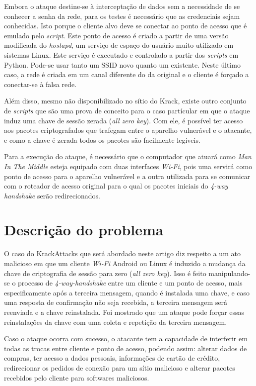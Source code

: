 \documentclass[12pt]{article}
\begin{document}
Embora o ataque destine-se à interceptação de dados sem a necessidade de se conhecer a senha da rede, para os testes é necessário que as credenciais sejam conhecidas. Isto porque o cliente alvo deve se conectar ao ponto de acesso que é emulado pelo \textit{script}. Este ponto de acesso é criado a partir de uma versão modificada do \textit{hostapd}, um serviço de espaço do usuário muito utilizado em sistemas Linux. Este serviço é executado e controlado a partir dos \textit{scripts} em Python. Pode-se usar tanto um SSID novo quanto um existente. Neste último caso, a rede é criada em um canal diferente do da original e o cliente é forçado a conectar-se à falsa rede.

Além disso, mesmo não disponibilizado no sítio do Krack, existe outro conjunto de \textit{scripts} que são uma prova de conceito para o caso partícular em que o ataque induz uma chave de sessão zerada (\textit{all zero key}). Com ele, é possível ter acesso aos pacotes criptografados que trafegam entre o aparelho vulnerável e o atacante, e como a chave é zerada todos os pacotes são facilmente legíveis.

Para a execução do ataque, é necessário que o computador que atuará como \textit{Man In The Middle} esteja equipado com duas interfaces \textit{Wi-Fi}, pois uma servirá como ponto de acesso para o aparelho vulnerável e a outra utilizada para se comunicar com o roteador de acesso original para o qual os pacotes iniciais do \textit{4-way handshake} serão redirecionados.


\section{Descrição do problema}
O caso do KrackAttacks que será abordado neste artigo diz respeito a um ato malicioso em que um cliente \textit{Wi-Fi} Android ou Linux é induzido a mudança da chave de criptografia de sessão para zero (\textit{all zero key}). Isso é feito manipulando-se o processo de \textit{4-way-handshake} entre um cliente e um ponto de acesso, mais especificamente após a terceira mensagem, quando é instalada uma chave, e caso uma resposta de confirmação não seja recebida, a terceira mensagem será reenviada e a chave reinstalada. Foi mostrado que um ataque pode forçar essas reinstalações da chave com uma coleta e repetição da terceira mensagem. 

Caso o ataque ocorra com sucesso, o atacante tem a capacidade de interferir em todas as trocas entre cliente e ponto de acesso, podendo assim: alterar dados de compras, ter acesso a dados pessoais, informações de cartão de crédito, redirecionar os pedidos de conexão para um sítio malicioso e alterar pacotes recebidos pelo cliente para softwares maliciosos. 
\end{document}
